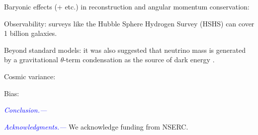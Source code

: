 \documentclass[aps,prd,twocolumn,amsmath,amssymb,amsfont,superscriptaddress]{revtex4-1}
\newcommand{\tcb}{\textcolor{blue}}
\begin{document}
Baryonic effects (+ etc.) in reconstruction and angular momentum conservation:

Observability: surveys like the Hubble Sphere Hydrogen Survey (HSHS) \citep{2006astro.ph..6104P} can cover 1 billion galaxies.

Beyond standard models: it was also suggested that neutrino mass is generated by a gravitational $\theta$-term condensation as the source of dark energy \citep{2016PhRvD..93k3002D}.

Cosmic variance:

Bias:

\tcb{\textit{Conclusion.---}} 

\tcb{\textit{Acknowledgments.---}}
We acknowledge funding from NSERC.



%
\end{document}
